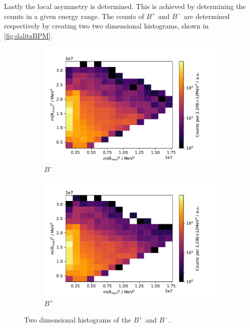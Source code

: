 Lastly the local asymmetry is determined. This is achieved by determining the counts in a given energy range. The counts of $B^+$ and $B^-$ are determined respectively by creating two two dimensional histograms, shown in \autoref{fig:dalitzBPM}.

\begin{figure}[H]
	\centering
	\begin{subfigure}{0.45\textwidth}
		\includegraphics[width=\textwidth]{content/pictures/image_fin/DalitzDataBNhist}
		\caption{$B^-$}
	\end{subfigure}
	\begin{subfigure}{0.45\textwidth}
		\includegraphics[width=\textwidth]{content/pictures/image_fin/DalitzDataBPhist}
		\caption{$B^+$}
	\end{subfigure} 
	\caption{Two dimensional histograms of the $B^+$ and $B^-$.} 
	\label{fig:dalitzBPM}
\end{figure}

